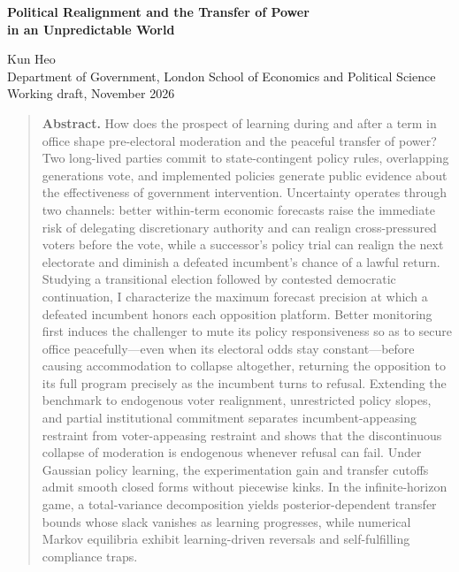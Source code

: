 \documentclass[11pt,letterpaper]{article}
\begin{document}
\thispagestyle{plain}
\begin{center}
{\LARGE\bfseries Political Realignment and the Transfer of Power\\[4pt]
in an Unpredictable World\par}
\vspace{10pt}
{\large Kun Heo}\\[3pt]
Department of Government, London School of Economics and Political Science\\
Working draft, November 2026
\end{center}

\begin{quote}\small
\noindent\textbf{Abstract.} How does the prospect of learning during and after a term in office shape pre-electoral moderation and the peaceful transfer of power? Two long-lived parties commit to state-contingent policy rules, overlapping generations vote, and implemented policies generate public evidence about the effectiveness of government intervention. Uncertainty operates through two channels: better within-term economic forecasts raise the immediate risk of delegating discretionary authority and can realign cross-pressured voters before the vote, while a successor's policy trial can realign the next electorate and diminish a defeated incumbent's chance of a lawful return. Studying a transitional election followed by contested democratic continuation, I characterize the maximum forecast precision at which a defeated incumbent honors each opposition platform. Better monitoring first induces the challenger to mute its policy responsiveness so as to secure office peacefully---even when its electoral odds stay constant---before causing accommodation to collapse altogether, returning the opposition to its full program precisely as the incumbent turns to refusal. Extending the benchmark to endogenous voter realignment, unrestricted policy slopes, and partial institutional commitment separates incumbent-appeasing restraint from voter-appeasing restraint and shows that the discontinuous collapse of moderation is endogenous whenever refusal can fail. Under Gaussian policy learning, the experimentation gain and transfer cutoffs admit smooth closed forms without piecewise kinks. In the infinite-horizon game, a total-variance decomposition yields posterior-dependent transfer bounds whose slack vanishes as learning progresses, while numerical Markov equilibria exhibit learning-driven reversals and self-fulfilling compliance traps.
\end{quote}
\end{document}
